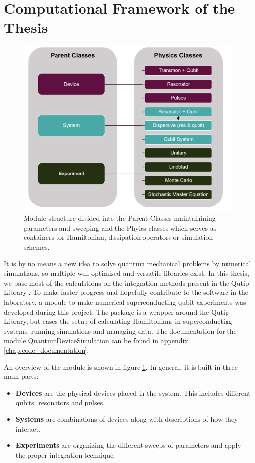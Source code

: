\section{Computational Framework of the Thesis}
\begin{figure}[h]
    \centering
    \includegraphics[width = 1.0 \textwidth]{Figs/Sections/Introduction/module_v2.png}
    \caption{Module structure divided into the Parent Classes maintainining parameters and sweeping and the Phyics classes which serves as containers for Hamiltonian, dissipation operators or simulation schemes.}
    \label{fig:module_overview}
\end{figure}
It is by no means a new idea to solve quantum mechanical problems by numerical simulations, so multiple well-optimized and versatile libraries exist. In this thesis, we base most of the calculations on the integration methods present in the Qutip Library \cite{johansson_qutip_2012}. To make faster progress and hopefully contribute to the software in the laboratory, a module to make numerical superconducting qubit experiments was developed during this project. The package is a wrapper around the Qutip Library, but eases the setup of calculating Hamiltonians in superconducting systems, running simulations and managing data. The documentation for the module QuantumDeviceSimulation can be found in appendix \ref{chap:code_documentation}.

An overview of the module is shown in figure \ref{fig:module_overview}. In general, it is built in three main parts:
\begin{itemize}
    \item \textbf{Devices} are the physical devices placed in the system. This includes different qubits, resonators and pulses.
    \item \textbf{Systems} are combinations of devices along with descriptions of how they interact.
    \item \textbf{Experiments} are organizing the different sweeps of parameters and apply the proper integration technique. 
\end{itemize}